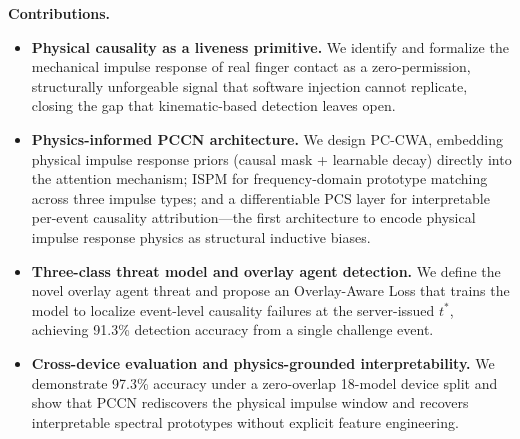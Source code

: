 \noindent\textbf{Contributions.}
\begin{itemize}[leftmargin=*,topsep=2pt,itemsep=1pt]
  \item \textbf{Physical causality as a liveness primitive.}
        We identify and formalize the mechanical impulse response of real finger contact as
        a zero-permission, structurally unforgeable signal that software injection cannot
        replicate, closing the gap that kinematic-based detection leaves open.

  \item \textbf{Physics-informed PCCN architecture.}
        We design PC-CWA, embedding physical impulse response priors (causal mask +
        learnable decay) directly into the attention mechanism; ISPM for frequency-domain
        prototype matching across three impulse types; and a differentiable PCS layer
        for interpretable per-event causality attribution---the first architecture to
        encode physical impulse response physics as structural inductive biases.

  \item \textbf{Three-class threat model and overlay agent detection.}
        We define the novel overlay agent threat and propose an Overlay-Aware Loss that
        trains the model to localize event-level causality failures at the server-issued
        $t^*$, achieving 91.3\% detection accuracy from a single challenge event.

  \item \textbf{Cross-device evaluation and physics-grounded interpretability.}
        We demonstrate 97.3\% accuracy under a zero-overlap 18-model device split and show
        that PCCN rediscovers the physical impulse window and recovers interpretable spectral
        prototypes without explicit feature engineering.
\end{itemize}
